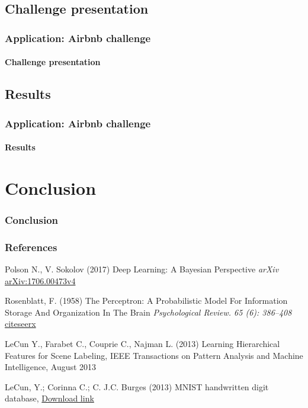 \documentclass{beamer}
\begin{document}
\subsection{Challenge presentation}
\begin{frame}
\frametitle{Application: Airbnb challenge}
\framesubtitle{Challenge presentation}
\end{frame}

\subsection{Results}
\begin{frame}
\frametitle{Application: Airbnb challenge}
\framesubtitle{Results}
\end{frame}



\section{Conclusion}
\begin{frame}
\frametitle{Conclusion}
\end{frame}




\begin{frame}
\frametitle{References}
\footnotesize{
\begin{thebibliography}{99} 
 Polson N., V. Sokolov (2017)
\newblock Deep Learning: A Bayesian Perspective
\newblock \emph{arXiv} \href{https://arxiv.org/pdf/1706.00473}{arXiv:1706.00473v4}

 Rosenblatt, F. (1958)
\newblock The Perceptron: A Probabilistic Model For Information Storage And Organization In The Brain
\newblock \emph{Psychological Review. 65 (6): 386–408} \href{http://citeseerx.ist.psu.edu/viewdoc/download?doi=10.1.1.335.3398&rep=rep1&type=pdf}{citeseerx}

 LeCun Y., Farabet C., Couprie C., Najman L. (2013)
\newblock Learning Hierarchical Features for Scene Labeling, 
\newblock IEEE Transactions on Pattern Analysis and Machine Intelligence, August 2013

 LeCun, Y.; Corinna C.; C. J.C. Burges (2013)
\newblock MNIST handwritten digit database, 
\newblock \href{http://yann.lecun.com/exdb/mnist}{Download link}

\end{thebibliography}
}
\end{frame}
\end{document}
